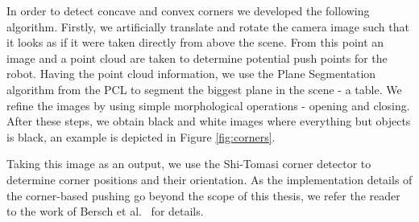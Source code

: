 In order to detect concave and convex corners we developed the following algorithm. Firstly, we artificially translate and rotate the camera image such that it looks as if it were taken directly from above the scene. From this point an image and a point cloud are taken to determine potential push points for the robot. Having the point cloud information, we use the Plane Segmentation algorithm from the PCL to segment the biggest plane in the scene - a table. We refine the images by using simple morphological operations - opening and closing. After these steps, we obtain black and white images where everything but objects is black, an example is depicted in Figure \ref{fig:corners}. 

Taking this image as an output, we use the Shi-Tomasi corner detector to determine corner positions and their orientation. As the implementation details of the corner-based pushing go beyond the scope of this thesis, we refer the reader to the work of Bersch et al.~\cite{bersch12interactive} for details.

